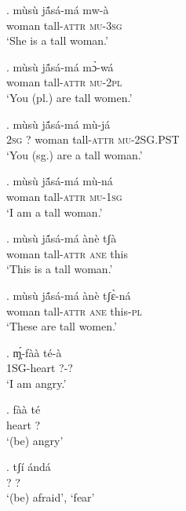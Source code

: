 \documentclass{assets/fieldnotes}
\begin{document}
\exg. mùsù jã́sá-má mw-à\\
woman tall-\textsc{attr} \textsc{mu}-\textsc{3sg}\\
`She is a tall woman.’

\exg. mùsù jã́sá-má mɔ̀-wá\\
woman tall-\textsc{attr} \textsc{mu}-\textsc{2pl}\\
`You (pl.) are tall women.’

\exg. mùsù jã́sá-má mù-já\\
\textsc{2sg} ? woman tall-\textsc{attr} \textsc{mu}-\textsc{2SG.PST}\\
`You (sg.) are a tall woman.’

\exg. mùsù jã́sá-má mù-ná\\
woman tall-\textsc{attr} \textsc{mu}-\textsc{1sg}\\
`I am a tall woman.’


\exg. mùsù jã́sá-má ànè tʃà \\
woman tall-\textsc{attr} \textsc{ane} this\\
`This is a tall woman.’

\exg. mùsù jã́sá-má ànè tʃɛ̀-ná\\
woman tall-\textsc{attr} \textsc{ane} this-\textsc{pl}\\
`These are tall women.’


\exg. ɱ̩́-fàà té-à\\
\textsc{1SG}-heart ?-?\\
`I am angry.’\\

\exg. fàà té\\
heart ?\\
`(be) angry’
    
\exg. tʃí ándá\\
? ?\\
`(be) afraid’, `fear’\\
\end{document}
